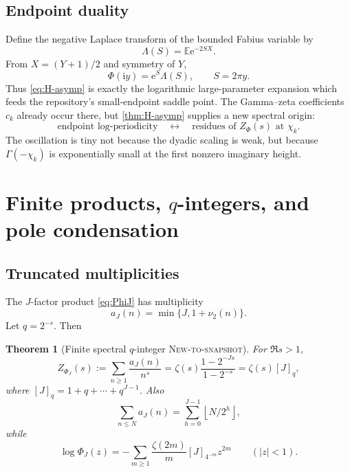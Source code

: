 \documentclass[11pt,oneside]{article}
\numberwithin{equation}{section}
\newtheorem{theorem}{Theorem}[section]
\theoremstyle{definition}
\theoremstyle{remark}
\newcommand{\E}{\mathbb E}
\newcommand{\ii}{\mathrm i}
\newcommand{\e}{\mathrm e}
\newcommand{\floor}[1]{\left\lfloor #1\right\rfloor}
\newcommand{\NewResult}{\textsc{New-to-snapshot}}
\begin{document}
\subsection{Endpoint duality}

Define the negative Laplace transform of the bounded Fabius variable by
\begin{equation}
 \Lambda(S)=\E\e^{-2SX}.                                   \label{eq:Lambda}
\end{equation}
From $X=(Y+1)/2$ and symmetry of $Y$,
\begin{equation}
 \boxed{\Phi(\ii y)=\e^S\Lambda(S),\qquad S=2\pi y.}       \label{eq:duality}
\end{equation}
Thus \eqref{eq:H-asymp} is exactly the logarithmic large-parameter expansion
which feeds the repository's small-endpoint saddle point.  The Gamma--zeta
coefficients $c_k$ already occur there, but \cref{thm:H-asymp} supplies a new
spectral origin:
\begin{equation}
 \text{endpoint log-periodicity}
 \quad\longleftrightarrow\quad
 \text{residues of }Z_\Phi(s)\text{ at }\chi_k.             \label{eq:duality-slogan}
\end{equation}
The oscillation is tiny not because the dyadic scaling is weak, but because
$\Gamma(-\chi_k)$ is exponentially small at the first nonzero imaginary height.

\section{Finite products, $q$-integers, and pole condensation}
\label{sec:qfinite}

\subsection{Truncated multiplicities}

The $J$-factor product \eqref{eq:PhiJ} has multiplicity
\begin{equation}
 a_J(n)=\min\{J,1+\nu_2(n)\}.                              \label{eq:aJ}
\end{equation}
Let $q=2^{-s}$.  Then
\begin{theorem}[Finite spectral $q$-integer \NewResult]
\label{thm:finite-zeta}
For $\Re s>1$,
\begin{equation}
 Z_{\Phi_J}(s):=\sum_{n\ge1}\frac{a_J(n)}{n^s}
 =\zeta(s)\frac{1-2^{-Js}}{1-2^{-s}}
 =\zeta(s)[J]_q,                                          \label{eq:finite-zeta}
\end{equation}
where $[J]_q=1+q+\cdots+q^{J-1}$.  Also
\begin{equation}
 \sum_{n\le N}a_J(n)=\sum_{h=0}^{J-1}\floor{N/2^h},       \label{eq:AJ}
\end{equation}
while
\begin{equation}
 \log\Phi_J(z)
 =-\sum_{m\ge1}\frac{\zeta(2m)}m[J]_{4^{-m}}z^{2m}
 \qquad(|z|<1).                                           \label{eq:finite-taylor}
\end{equation}
\end{theorem}
\end{document}
